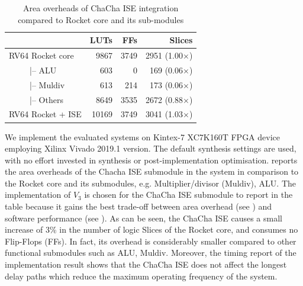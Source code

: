 \begin{table}
	\caption{Area overheads of ChaCha ISE integration compared to Rocket core and its sub-modules}
	\label{tab:res:hardcost2}
    \centering
	\begin{tabular}{lrrr}
		\toprule            
		                 &     LUTs   &   FFs  &   Slices \\
		\midrule
		RV64 Rocket core  &    9867   &  3749  & 2951 (1.00$\times$)\\
		~~~~~|-- ALU      &     603   &     0  &  169 (0.06$\times$) \\
		~~~~~|-- Muldiv   &     613   &   214  &  173 (0.06$\times$)\\
		~~~~~|-- Others   &    8649   &  3535  & 2672 (0.88$\times$)\\
		RV64 Rocket + ISE &   10169   &  3749  & 3041 (1.03$\times$)\\ 
		
		\bottomrule
	\end{tabular} 
\end{table}

We implement the evaluated systems on Kintex-7 XC7K160T FPGA device employing Xilinx Vivado 2019.1 version. 
The default synthesis settings are used, with no effort invested in synthesis or post-implementation optimisation.
 reports the area overheads of the Chacha ISE submodule in the system in comparison to the Rocket core and its submodules, e.g. Multiplier/divisor (Muldiv), ALU. 
The implementation of $V_3$ is chosen for the ChaCha ISE submodule to report in the table because it gains the best trade-off between area overhead (see ) and software performance (see ). 
As can be seen, 
the ChaCha ISE causes a small increase of 3\% in the number of logic Slices of the Rocket core, and consumes no Flip-Flops (FFs). 
In fact, its overhead is considerably smaller compared to other functional submodules such as ALU, Muldiv. 
Moreover, the timing report of the implementation result shows that the ChaCha ISE does not affect the longest delay paths which reduce the maximum operating frequency of the system.



